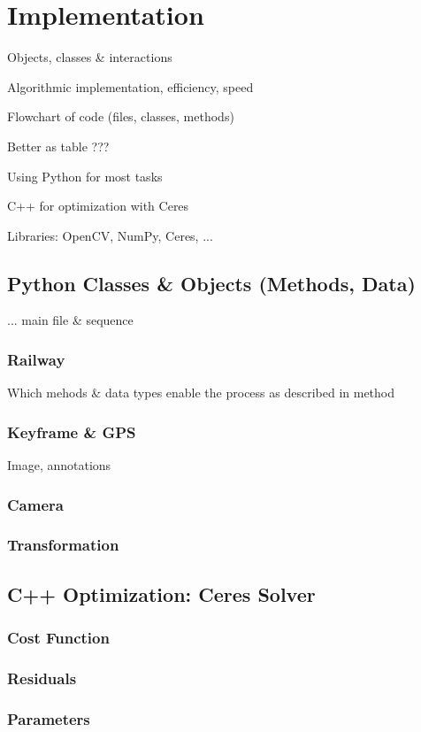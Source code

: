 \chapter{Implementation}
\label{chapter:implementation}

Objects, classes \& interactions

Algorithmic implementation, efficiency, speed

Flowchart of code (files, classes, methods)


Better as table ???



Using Python for most tasks

C++ for optimization with Ceres

Libraries: OpenCV, NumPy, Ceres, ...

\section{Python Classes \& Objects (Methods, Data)}


... main file \& sequence


\subsection{Railway}

Which mehods \& data types enable the process as described in method


\subsection{Keyframe \& GPS}


Image, annotations


\subsection{Camera}





\subsection{Transformation}






\section{C++ Optimization: Ceres Solver}

\subsection{Cost Function}

\subsection{Residuals}

\subsection{Parameters}
